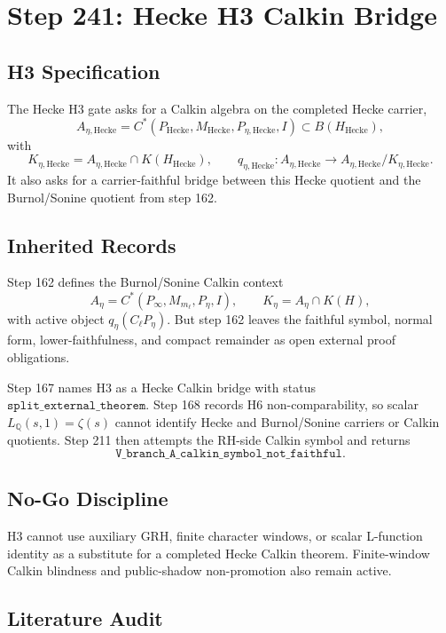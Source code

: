 \section*{Step 241: Hecke H3 Calkin Bridge}

\subsection*{H3 Specification}

The Hecke H3 gate asks for a Calkin algebra on the completed Hecke carrier,
\[
A_{\eta,\mathrm{Hecke}}
  = C^*(P_{\mathrm{Hecke}},M_{\mathrm{Hecke}},P_{\eta,\mathrm{Hecke}},I)
  \subset B(H_{\mathrm{Hecke}}),
\]
with
\[
K_{\eta,\mathrm{Hecke}}
  = A_{\eta,\mathrm{Hecke}}\cap K(H_{\mathrm{Hecke}}),
\qquad
q_{\eta,\mathrm{Hecke}}:A_{\eta,\mathrm{Hecke}}\to
A_{\eta,\mathrm{Hecke}}/K_{\eta,\mathrm{Hecke}}.
\]
It also asks for a carrier-faithful bridge between this Hecke quotient and the
Burnol/Sonine quotient from step 162.

\subsection*{Inherited Records}

Step 162 defines the Burnol/Sonine Calkin context
\[
A_\eta=C^*(P_\infty,M_{m_\ell},P_\eta,I),
\qquad
K_\eta=A_\eta\cap K(H),
\]
with active object \(q_\eta(C_\ell P_\eta)\). But step 162 leaves the faithful
symbol, normal form, lower-faithfulness, and compact remainder as open external
proof obligations.

Step 167 names H3 as a Hecke Calkin bridge with status
\(\texttt{split\_external\_theorem}\). Step 168 records H6
non-comparability, so scalar \(L_{\mathbb Q}(s,1)=\zeta(s)\) cannot identify
Hecke and Burnol/Sonine carriers or Calkin quotients. Step 211 then attempts
the RH-side Calkin symbol and returns
\[
\texttt{V\_branch\_A\_calkin\_symbol\_not\_faithful}.
\]

\subsection*{No-Go Discipline}

H3 cannot use auxiliary GRH, finite character windows, or scalar L-function
identity as a substitute for a completed Hecke Calkin theorem. Finite-window
Calkin blindness and public-shadow non-promotion also remain active.

\subsection*{Literature Audit}

